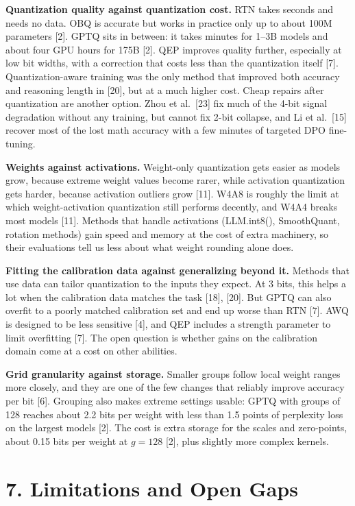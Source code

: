 \documentclass[10pt,twocolumn]{article}
\begin{document}
\textbf{Quantization quality against quantization cost.} RTN takes
seconds and needs no data. OBQ is accurate but works in practice only up
to about 100M parameters [2]. GPTQ sits in between: it takes minutes for
1--3B models and about four GPU hours for 175B [2]. QEP improves quality
further, especially at low bit widths, with a correction that costs less
than the quantization itself [7]. Quantization-aware training was the
only method that improved both accuracy and reasoning length in [20],
but at a much higher cost. Cheap repairs after quantization are another
option. Zhou et al.~[23] fix much of the 4-bit signal degradation
without any training, but cannot fix 2-bit collapse, and Li et al.~[15]
recover most of the lost math accuracy with a few minutes of targeted
DPO fine-tuning.

\textbf{Weights against activations.} Weight-only quantization gets
easier as models grow, because extreme weight values become rarer, while
activation quantization gets harder, because activation outliers grow
[11]. W4A8 is roughly the limit at which weight-activation quantization
still performs decently, and W4A4 breaks most models [11]. Methods that
handle activations (LLM.int8(), SmoothQuant, rotation methods) gain
speed and memory at the cost of extra machinery, so their evaluations
tell us less about what weight rounding alone does.

\textbf{Fitting the calibration data against generalizing beyond it.}
Methods that use data can tailor quantization to the inputs they expect.
At 3 bits, this helps a lot when the calibration data matches the task
[18], [20]. But GPTQ can also overfit to a poorly matched calibration
set and end up worse than RTN [7]. AWQ is designed to be less sensitive
[4], and QEP includes a strength parameter to limit overfitting [7]. The
open question is whether gains on the calibration domain come at a cost
on other abilities.

\textbf{Grid granularity against storage.} Smaller groups follow local
weight ranges more closely, and they are one of the few changes that
reliably improve accuracy per bit [6]. Grouping also makes extreme
settings usable: GPTQ with groups of 128 reaches about 2.2 bits per
weight with less than 1.5 points of perplexity loss on the largest
models [2]. The cost is extra storage for the scales and zero-points,
about 0.15 bits per weight at $g = 128$ [2], plus slightly more complex
kernels.

\section{7. Limitations and Open Gaps}
\end{document}
